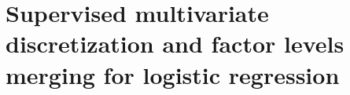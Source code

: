 \chapter{Supervised multivariate discretization and factor levels merging for logistic regression}

